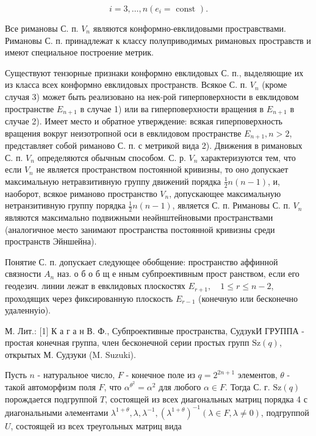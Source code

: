 \documentclass[10pt]{article}
\begin{document}
\[

i=3, \ldots, n\left(e_{i}=\text { const }\right) .

\]



Все римановы С. п. $V_{n}$ являются конформно-евклидовыми простравствами. Римановы С. п. принадлежат к классу полуприводимых римановых простравств и имеют специальное построение метрик.



Существуют тензорные признаки конформно евклидовых С. п., выделяющие их из класса всех конформно евклидовых пространств. Всякое С. п. $V_{n}$ (кроме случая 3) может быть реализовано на нек-рой гиперповерхности в евклидовом пространстве $E_{n+1}$ в случае 1) или ва гиперповерхности вращения в $E_{n+1}$ в случае 2). Имеет место и обратное утверждение: всякая гиперповерхность вращения вокруг неизотропной оси в евклидовом пространстве $E_{n+1}, n>2$, представляет собой риманово С. п. с метрикой вида 2). Движения в римановых С. п. $V_{n}$ определяются обычным способом. С. р. $V_{n}$ характеризуются тем, что если $V_{n}$ не является пространством постоянной кривизны, то оно допускает максимальную нетравзитивную группу движений порядка $\frac{1}{2} n(n-1)$, и, наоборот, всякое риманово пространство $V_{n}$, допускающее максимальную нетранзитивную группу порядка $\frac{1}{2} n(n-1)$, является С. п. Римановы С. п. $V_{n}$ являются максимально подвижными неәйнштейновыми пространствами (аналогичное место занимают пространства постоянной кривизны среди пространств Эйншейна).



Понятие С. п. допускает следующее обобщение: пространство аффинной связности $A_{n}$ наз. о б о б щ е нным субпроективным прост ранством, если его геодезич. линии лежат в евклидовых плоскостях $E_{r+1}, \quad 1 \leqslant r \leqslant n-2$, проходящих через фиксированную плоскость $E_{r-1}$ (конечную или бесконечно удаленнуіо).



М. Лит.: [1] К а г а н В. Ф., Субпроективные пространства, СудзукИ ГРУППА - простая конечная группа, член бесконечной серии простых групп $\mathrm{Sz}(q)$, открытых М. Судзуки (M. Suzuki).



Пусть $n$ - натуральное число, $F$ - конечное поле из $q=2^{2 n+1}$ элементов, $\theta$ - такой автоморфизм поля $F$, что $\alpha^{\theta^{2}}=\alpha^{2}$ для любого $\alpha \in F$. Тогда С. г. $\mathrm{Sz}(q)$ порождается подгруппой $T$, состоящей из всех диагональных матриц порядка 4 с диагональными әлементами $\lambda^{1+\theta}, \lambda, \lambda^{-1},\left(\lambda^{1+\theta}\right)^{-1}(\lambda \in F, \lambda \neq 0)$, подгруппой $U$, состоящей из всех треугольных матриц вида
\end{document}
